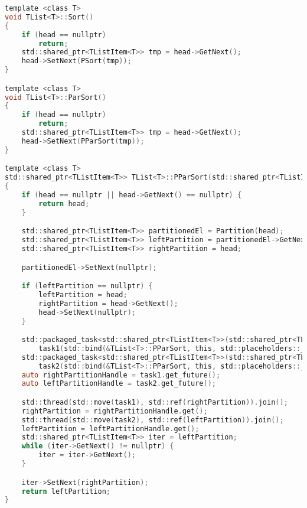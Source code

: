 \begin{lstlisting}[language=C]
template <class T>
void TList<T>::Sort()
{
    if (head == nullptr)
        return;
    std::shared_ptr<TListItem<T>> tmp = head->GetNext();
    head->SetNext(PSort(tmp));
}

template <class T>
void TList<T>::ParSort()
{
    if (head == nullptr)
        return;
    std::shared_ptr<TListItem<T>> tmp = head->GetNext();
    head->SetNext(PParSort(tmp));
}

template <class T>
std::shared_ptr<TListItem<T>> TList<T>::PParSort(std::shared_ptr<TListItem<T>> &head)
{
    if (head == nullptr || head->GetNext() == nullptr) {
        return head;
    }

    std::shared_ptr<TListItem<T>> partitionedEl = Partition(head);
    std::shared_ptr<TListItem<T>> leftPartition = partitionedEl->GetNext();
    std::shared_ptr<TListItem<T>> rightPartition = head;

    partitionedEl->SetNext(nullptr);

    if (leftPartition == nullptr) {
        leftPartition = head;
        rightPartition = head->GetNext();
        head->SetNext(nullptr);
    }

    std::packaged_task<std::shared_ptr<TListItem<T>>(std::shared_ptr<TListItem<T>>&)>
        task1(std::bind(&TList<T>::PParSort, this, std::placeholders::_1));
    std::packaged_task<std::shared_ptr<TListItem<T>>(std::shared_ptr<TListItem<T>>&)>
        task2(std::bind(&TList<T>::PParSort, this, std::placeholders::_1));
    auto rightPartitionHandle = task1.get_future();
    auto leftPartitionHandle = task2.get_future();

    std::thread(std::move(task1), std::ref(rightPartition)).join();
    rightPartition = rightPartitionHandle.get();
    std::thread(std::move(task2), std::ref(leftPartition)).join();
    leftPartition = leftPartitionHandle.get();
    std::shared_ptr<TListItem<T>> iter = leftPartition;
    while (iter->GetNext() != nullptr) {
        iter = iter->GetNext();
    }

    iter->SetNext(rightPartition);
    return leftPartition;
}

\end{lstlisting}


